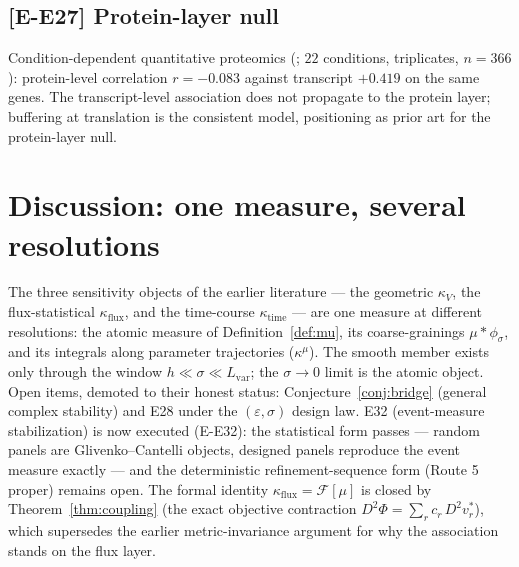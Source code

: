 \documentclass[11pt,a4paper]{article}
\theoremstyle{plain}
\theoremstyle{definition}
\theoremstyle{remark}
\newcommand{\kk}{\kappa_{\!V}}
\newcommand{\kmu}{\kappa^{\mu}}
\begin{document}
\subsection{[E-E27] Protein-layer null}
Condition-dependent quantitative proteomics (\citet{schmidt2016}; $22$ conditions, triplicates,
$n = 366$): protein-level correlation $r = -0.083$ against transcript
$+0.419$ on the same genes. The transcript-level association does not
propagate to the protein layer; buffering at translation is the consistent
model, positioning \citet{kochanowski2013} as prior art for the protein-layer
null.

\section{Discussion: one measure, several resolutions}
\label{sec:discussion}

The three sensitivity objects of the earlier literature --- the geometric
$\kk$, the flux-statistical $\kappa_{\mathrm{flux}}$, and the time-course
$\kappa_{\mathrm{time}}$ --- are one measure at different resolutions: the
atomic measure of Definition~\ref{def:mu}, its coarse-grainings
$\mu * \phi_\sigma$, and its integrals along parameter trajectories
($\kmu$). The smooth member exists only through the window
$h \ll \sigma \ll L_{\mathrm{var}}$; the $\sigma \to 0$ limit is the
atomic object. Open items, demoted to their honest status:
Conjecture~\ref{conj:bridge} (general complex stability) and E28
under the $(\varepsilon, \sigma)$ design law. E32 (event-measure
stabilization) is now executed (E-E32): the statistical form passes
--- random panels are Glivenko--Cantelli objects, designed panels
reproduce the event measure exactly --- and the deterministic
refinement-sequence form (Route 5 proper) remains open.
The formal identity $\kappa_{\mathrm{flux}} = \mathcal{F}[\mu]$ is closed by
Theorem~\ref{thm:coupling} (the exact objective contraction
$D^2\Phi = \sum_r c_r\, D^2 v^*_r$), which supersedes the earlier
metric-invariance argument for why the association stands on the flux
layer.
\end{document}
